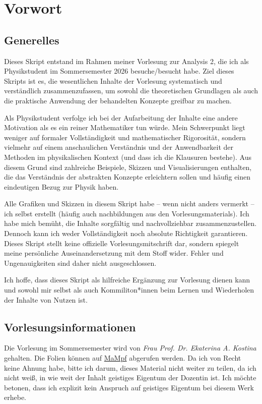 \chapter{Vorwort}

\section*{Generelles}
Dieses Skript entstand im Rahmen meiner Vorlesung zur Analysis 2, die ich als Physikstudent im Sommersemester 2026 besuche/besucht habe. Ziel dieses Skripts ist es, die wesentlichen Inhalte der Vorlesung systematisch und verständlich zusammenzufassen, um sowohl die theoretischen Grundlagen als auch die praktische Anwendung der behandelten Konzepte greifbar zu machen.

Als Physikstudent verfolge ich bei der Aufarbeitung der Inhalte eine andere Motivation als es ein reiner Mathematiker tun würde. Mein Schwerpunkt liegt weniger auf formaler Vollständigkeit und mathematischer Rigorosität, sondern vielmehr auf einem anschaulichen Verständnis und der Anwendbarkeit der Methoden im physikalischen Kontext (und dass ich die Klausuren bestehe). Aus diesem Grund sind zahlreiche Beispiele, Skizzen und Visualisierungen enthalten, die das Verständnis der abstrakten Konzepte erleichtern sollen und häufig einen eindeutigen Bezug zur Physik haben.

Alle Grafiken und Skizzen in diesem Skript habe -- wenn nicht anders vermerkt -- ich selbst erstellt (häufig auch nachbildungen aus den Vorlesungsmaterials). Ich habe mich bemüht, die Inhalte sorgfältig und nachvollziehbar zusammenzustellen. Dennoch kann ich weder Vollständigkeit noch absolute Richtigkeit garantieren. Dieses Skript stellt keine offizielle Vorlesungsmitschrift dar, sondern spiegelt meine persönliche Auseinandersetzung mit dem Stoff wider. Fehler und Ungenauigkeiten sind daher nicht ausgeschlossen.

Ich hoffe, dass dieses Skript als hilfreiche Ergänzung zur Vorlesung dienen kann und sowohl mir selbst als auch Kommiliton*innen beim Lernen und Wiederholen der Inhalte von Nutzen ist.

\section*{Vorlesungsinformationen}
Die Vorlesung im Sommersemester wird von \emph{Frau Prof. Dr. Ekaterina A. Kostina} gehalten. Die Folien können auf \href{https://mampf.mathi.uni-heidelberg.de/lectures/313}{MaMpf} abgerufen werden.
Da ich von Recht keine Ahnung habe, bitte ich darum, dieses Material nicht weiter zu teilen, da ich nicht weiß, in wie weit der Inhalt geistiges Eigentum der Dozentin ist. Ich möchte betonen, dass ich explizit kein Anspruch auf geistiges Eigentum bei diesem Werk erhebe.

